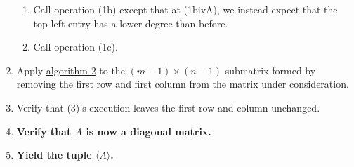 \documentclass[twocolumn]{article}
\begin{document}
\begin{enumerate}
\begin{enumerate}
						\item Call operation (1b) except that at (1bivA), we instead expect that the top-left entry has a lower degree than before.
						\item Call operation (1c).
					\end{enumerate}
				\item Apply \hyperref[sec:algorithm 2]{algorithm 2} to the $(m-1)\times(n-1)$ submatrix formed by removing the first row and first column from the matrix under consideration.
				\item Verify that (3)'s execution leaves the first row and column unchanged.
				\item \textbf{Verify that $A$ is now a diagonal matrix.}
				\item \textbf{Yield the tuple $\langle A\rangle$.}
			\end{enumerate}
\end{document}
